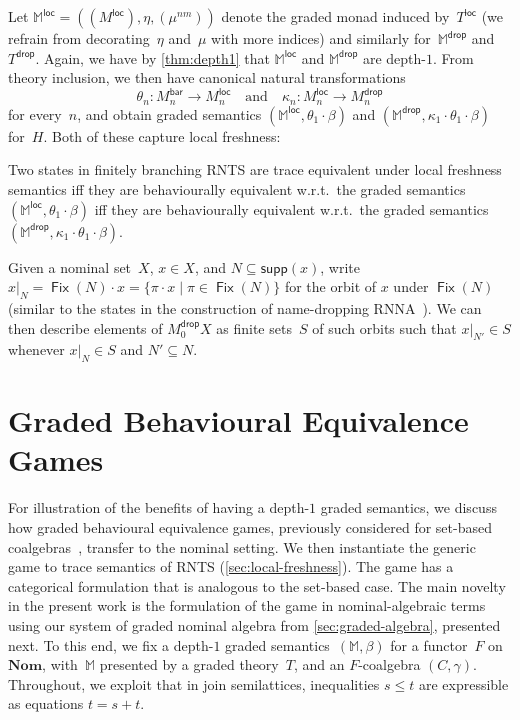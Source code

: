 \documentclass[a4paper,UKenglish,cleveref,thm-restate,numberwithinsect,final]{lipics-v2021}
\newcommand{\Br}{\mathsf{bar}}
\newcommand{\loc}{\mathsf{loc}}
\newcommand{\drop}{\mathsf{drop}}
\newcommand{\supp}{\mathsf{supp}}
\newcommand{\Fix}{\mathop{\mathsf{Fix}}}
\theoremstyle{plain}
\numberwithin{equation}{section}
\newcommand{\monad}{{\mathbb{M}}}
\newcommand{\+}[1]{\mathcal{#1}\xspace}
\newcommand{\Nom}{\mathbf{Nom}}
\theoremstyle{definition}
\begin{document}
Let $\monad^\loc=((M^\loc),\eta,(\mu^{nm}))$ denote the graded monad
induced by~$T^\loc$ (we refrain from decorating~$\eta$ and~$\mu$ with
more indices) and similarly for~$\monad^\drop$ and $T^\drop$. Again,
we have by \cref{thm:depth1} that $\monad^\loc$ and $\monad^\drop$ are
depth-$1$. From theory inclusion, we then have canonical natural
transformations
\begin{equation*}
  \theta_n\colon M_n^\Br \to M_n^\loc\quad \text{and}\quad\kappa_n\colon M_n^\loc \to M_n^\drop
\end{equation*}
for every~$n$, and obtain graded semantics
$(\monad^\loc,\theta_1\cdot\beta)$ and
$(\monad^\drop,\kappa_1\cdot\theta_1\cdot\beta)$
for~$H$. Both of these capture local freshness:
\begin{theorem}\label{thm:local-freshness}
  Two states in finitely branching RNTS are trace equivalent under
  local freshness semantics iff they are behaviourally equivalent
  w.r.t.~the graded semantics \mbox{
    $(\monad^\loc,\theta_1\cdot\beta)$} iff they are behaviourally
  equivalent w.r.t.~the graded semantics \mbox{
    $(\monad^\drop,\kappa_1\cdot\theta_1\cdot\beta)$}.
\end{theorem}
\begin{remark}
  \label{rem:namerestrictionmodel}
  Given a nominal set~$X$, $x\in X$, and $N \subseteq \supp(x)$, write
  $x|_N = \Fix(N) \cdot x = \{\pi \cdot x \mid \pi \in \Fix(N)\}$ for
  the orbit of $x$ under $\Fix(N)$ (similar to the states in the
  construction of name-dropping RNNA~\cite{SchroderEA17}). We can
  then describe elements of $M^\drop_0X$ as finite sets~$S$ of such
  orbits such that $x|_{N'} \in S$ whenever $x|_N \in S$ and
  $N' \subseteq N$.
\end{remark}



\section{Graded Behavioural Equivalence Games}
\label{sec:games}

For illustration of the benefits of having a depth-$1$ graded
semantics, we discuss how graded behavioural equivalence games,
previously considered for set-based coalgebras~\cite{FordEA22},
transfer to the nominal setting. We then instantiate the generic game
to trace semantics of RNTS (\cref{sec:local-freshness}). The game has
a categorical formulation that is analogous to the set-based case.  %
The main novelty in the present work is the
formulation of the game in nominal-algebraic terms using our system of
graded nominal algebra from \cref{sec:graded-algebra}, presented
next. To this end, we fix a depth-$1$ graded
semantics~$(\monad,\beta)$ for a functor~$F$ on~$\Nom$, with~$\monad$
presented by a graded theory~$T$, and an $F$-coalgebra
$(C,\gamma)$. Throughout, we exploit that in join semilattices,
inequalities $s\le t$ are expressible as equations $t=s+t$.
\end{document}
